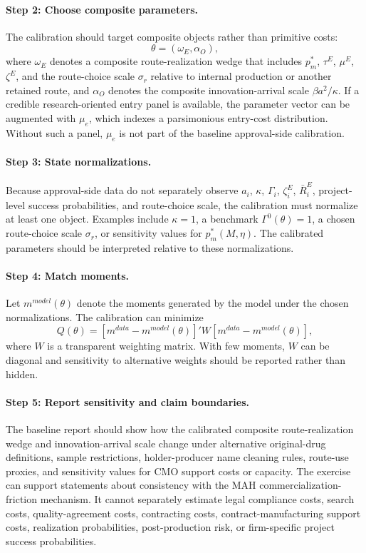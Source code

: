 \documentclass[12pt]{article}
\newcommand{\1}{\mathbf{1}}
\begin{document}
\paragraph{Step 2: Choose composite parameters.}
The calibration should target composite objects rather than primitive costs:
\[
\theta
=
\left(
\omega_E,\alpha_O
\right),
\]
where $\omega_E$ denotes a composite route-realization wedge that includes $p_m^*$, $\tau^E$, $\mu^E$, $\zeta^E$, and the route-choice scale $\sigma_r$ relative to internal production or another retained route, and $\alpha_O$ denotes the composite innovation-arrival scale $\beta a^2/\kappa$. If a credible research-oriented entry panel is available, the parameter vector can be augmented with $\mu_e$, which indexes a parsimonious entry-cost distribution. Without such a panel, $\mu_e$ is not part of the baseline approval-side calibration.

\paragraph{Step 3: State normalizations.}
Because approval-side data do not separately observe $a_i$, $\kappa$, $\Gamma_i$, $\zeta_i^E$, $\bar R_i^E$, project-level success probabilities, and route-choice scale, the calibration must normalize at least one object. Examples include $\kappa=1$, a benchmark $\Gamma^0(\theta)=1$, a chosen route-choice scale $\sigma_r$, or sensitivity values for $p_m^*(M,\eta)$. The calibrated parameters should be interpreted relative to these normalizations.

\paragraph{Step 4: Match moments.}
Let $m^{model}(\theta)$ denote the moments generated by the model under the chosen normalizations. The calibration can minimize
\begin{equation}
Q(\theta)
=
\left[m^{data}-m^{model}(\theta)\right]'W
\left[m^{data}-m^{model}(\theta)\right],
\label{eq:calib_objective}
\end{equation}
where $W$ is a transparent weighting matrix. With few moments, $W$ can be diagonal and sensitivity to alternative weights should be reported rather than hidden.

\paragraph{Step 5: Report sensitivity and claim boundaries.}
The baseline report should show how the calibrated composite route-realization wedge and innovation-arrival scale change under alternative original-drug definitions, sample restrictions, holder-producer name cleaning rules, route-use proxies, and sensitivity values for CMO support costs or capacity. The exercise can support statements about consistency with the MAH commercialization-friction mechanism. It cannot separately estimate legal compliance costs, search costs, quality-agreement costs, contracting costs, contract-manufacturing support costs, realization probabilities, post-production risk, or firm-specific project success probabilities.
\end{document}
